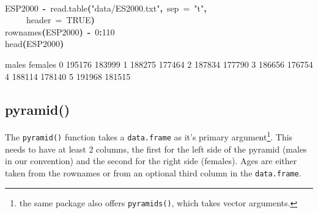 \documentclass[a4paper]{article}
\newcommand{\hlnumber}[1]{\textcolor[rgb]{0.0823529411764706,0.0784313725490196,0.709803921568627}{#1}}%
\newcommand{\hlfunctioncall}[1]{\textcolor[rgb]{1,0,0}{#1}}%
\newcommand{\hlstring}[1]{\textcolor[rgb]{0.6,0.6,1}{#1}}%
\newcommand{\hlkeyword}[1]{\textcolor[rgb]{0,0,0}{\textbf{#1}}}%
\newcommand{\hlargument}[1]{\textcolor[rgb]{0.694117647058824,0.247058823529412,0.0196078431372549}{#1}}%
\newcommand{\hlassignement}[1]{\textcolor[rgb]{0.215686274509804,0.215686274509804,0.384313725490196}{\textbf{#1}}}%
\newcommand{\hlsymbol}[1]{\textcolor[rgb]{0,0,0}{#1}}%
\newcommand{\hlprompt}[1]{\textcolor[rgb]{0,0,0}{#1}}%
\newcommand{\hlstd}[1]{\textcolor[rgb]{0,0,0}{#1}}%
\newenvironment{Houtput}{\raggedright}{%
%
}
\renewenvironment{Schunk}{\vspace{\topsep}}{\vspace{\topsep}}
\begin{document}
\begin{Houtput}
\hspace*{\fill}\\
\hlstd{}\ttfamily\noindent
\hlprompt{\usebox{\hlnormalsizeboxgreaterthan}{\ }}\hlsymbol{ESP2000}{\ }\hlassignement{\usebox{\hlnormalsizeboxlessthan}-}{\ }\hlfunctioncall{read.table}\hlkeyword{(}\hlstring{"data/ES2000.txt"}\hlkeyword{,}{\ }\hlargument{sep}{\ }\hlargument{=}{\ }\hlstring{"\usebox{\hlnormalsizeboxbackslash}t"}\hlkeyword{,}\hspace*{\fill}\\
\hlstd{}\hlprompt{{\ }}{\ }{\ }{\ }{\ }\hlargument{header}{\ }\hlargument{=}{\ }\hlnumber{TRUE}\hlkeyword{)}\mbox{}
\normalfont
\hspace*{\fill}\\
\hlstd{}\ttfamily\noindent
\hlprompt{\usebox{\hlnormalsizeboxgreaterthan}{\ }}\hlfunctioncall{rownames}\hlkeyword{(}\hlsymbol{ESP2000}\hlkeyword{)}{\ }\hlassignement{\usebox{\hlnormalsizeboxlessthan}-}{\ }\hlnumber{0}\hlkeyword{:}\hlnumber{110}\mbox{}
\normalfont
\hspace*{\fill}\\
\hlstd{}\ttfamily\noindent
\hlprompt{\usebox{\hlnormalsizeboxgreaterthan}{\ }}\hlfunctioncall{head}\hlkeyword{(}\hlsymbol{ESP2000}\hlkeyword{)}\mbox{}
\normalfont
\hspace*{\fill}\\
\hlstd{}\begin{Schunk}
\begin{Soutput}
   males females
0 195176  183999
1 188275  177464
2 187834  177790
3 186656  176754
4 188114  178140
5 191968  181515
\end{Soutput}

\end{Schunk}
\end{Houtput}

\subsection{pyramid()}
The \texttt{pyramid()} function takes a \texttt{data.frame} as it's primary argument\footnote{the same package also offers \texttt{pyramids()}, which takes vector arguments.}. This needs to have at least 2 columns, the first for the left side of the pyramid (males in our convention) and the second for the right side (females). Ages are either taken from the rownames or from an optional third column in the \texttt{data.frame}.
\end{document}

